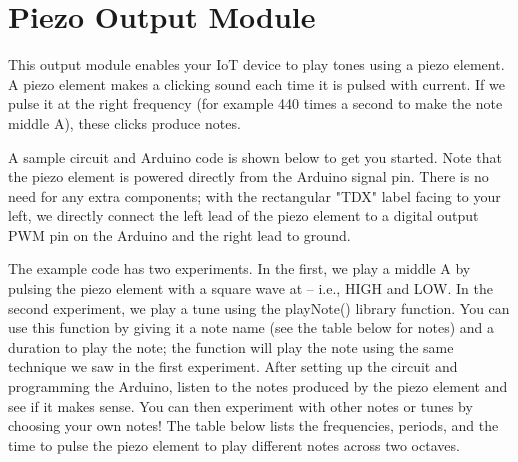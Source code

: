 
\clearpage
\section{Piezo Output Module}
\label{sec-output-piezo}

This output module enables your IoT device to play tones using a piezo
element. A piezo element makes a clicking sound each time it is pulsed
with current. If we pulse it at the right frequency (for example 440
times a second to make the note middle A), these clicks produce notes.

A sample circuit and Arduino code is shown below to get you started.
Note that the piezo element is powered directly from the Arduino signal
pin. There is no need for any extra components; with the rectangular
"TDX" label facing to your left, we directly connect the left lead of
the piezo element to a digital output PWM pin on the Arduino and the
right lead to ground.

The example code has two experiments. In the first, we play a middle A
by pulsing the piezo element with a square wave at  -- i.e.,
 HIGH and  LOW. In the second
experiment, we play a tune using the playNote() library function. You
can use this function by giving it a note name (see the table below for
notes) and a duration to play the note; the function will play the note
using the same technique we saw in the first experiment. After setting
up the circuit and programming the Arduino, listen to the notes produced
by the piezo element and see if it makes sense. You can then experiment
with other notes or tunes by choosing your own notes! The table below
lists the frequencies, periods, and the time to pulse the piezo element
to play different notes across two octaves.


